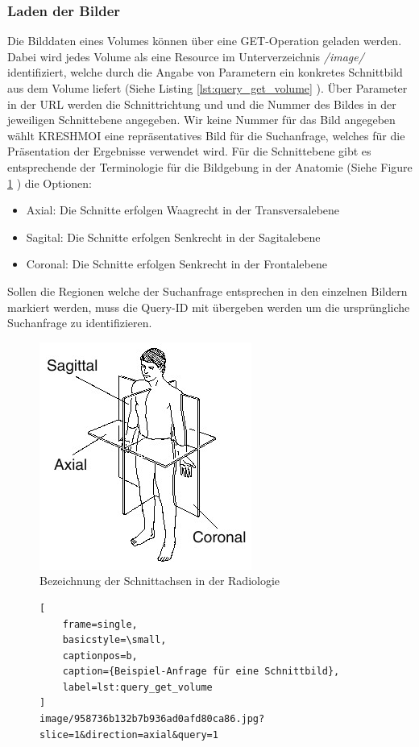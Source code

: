 \subsubsection{Laden der Bilder}
\label{sec:Laden_der_Bilder}
Die Bilddaten eines Volumes können über eine GET-Operation geladen werden.
Dabei wird jedes Volume als eine Resource im Unterverzeichnis \textit{/image/} identifiziert, 
welche durch die Angabe von Parametern ein konkretes Schnittbild aus dem Volume liefert (Siehe Listing \ref{lst:query_get_volume} ).
Über Parameter in der URL werden die Schnittrichtung und und die Nummer des Bildes in der jeweiligen Schnittebene angegeben.
Wir keine Nummer für das Bild angegeben wählt KRESHMOI eine repräsentatives Bild für die Suchanfrage, welches für die Präsentation der Ergebnisse verwendet wird.
Für die Schnittebene gibt es entsprechende der Terminologie für die Bildgebung in der Anatomie (Siehe Figure \ref{fig:planes_body} ) die Optionen:
\begin{itemize}
	\item Axial: Die Schnitte erfolgen Waagrecht in der Transversalebene
	\item Sagital: Die Schnitte erfolgen Senkrecht in der Sagitalebene
	\item Coronal: Die Schnitte erfolgen Senkrecht in der Frontalebene 
\end{itemize}
Sollen die Regionen welche der Suchanfrage entsprechen in den einzelnen Bildern markiert werden, muss die Query-ID mit übergeben werden um die ursprüngliche Suchanfrage zu identifizieren.
\begin{figure}
	\centering
	\includegraphics[width=0.3\linewidth]{img/planes_body.jpg}
	\caption{Bezeichnung der Schnittachsen in der Radiologie}
	\label{fig:planes_body}
\end{figure}
\begin{figure}[t]
\begin{lstlisting}[
	frame=single,
	basicstyle=\small,
	captionpos=b,
	caption={Beispiel-Anfrage für eine Schnittbild},
	label=lst:query_get_volume
]
image/958736b132b7b936ad0afd80ca86.jpg?slice=1&direction=axial&query=1
\end{lstlisting}
\end{figure}

